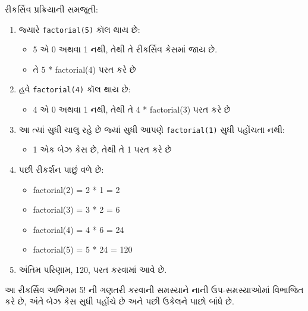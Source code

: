 રીકર્સિવ પ્રક્રિયાની સમજૂતી:

\begin{enumerate}
\def\labelenumi{\arabic{enumi}.}
\tightlist
\item
  જ્યારે \texttt{factorial(5)} કૉલ થાય છે:

  \begin{itemize}
  \tightlist
  \item
    5 એ 0 અથવા 1 નથી, તેથી તે રીકર્સિવ કેસમાં જાય છે.
  \item
    તે 5 * factorial(4) પરત કરે છે
  \end{itemize}
\item
  હવે \texttt{factorial(4)} કૉલ થાય છે:

  \begin{itemize}
  \tightlist
  \item
    4 એ 0 અથવા 1 નથી, તેથી તે 4 * factorial(3) પરત કરે છે
  \end{itemize}
\item
  આ ત્યાં સુધી ચાલુ રહે છે જ્યાં સુધી આપણે \texttt{factorial(1)} સુધી પહોંચતા નથી:

  \begin{itemize}
  \tightlist
  \item
    1 એક બેઝ કેસ છે, તેથી તે 1 પરત કરે છે
  \end{itemize}
\item
  પછી રીકર્શન પાછું વળે છે:

  \begin{itemize}
  \tightlist
  \item
    factorial(2) = 2 * 1 = 2
  \item
    factorial(3) = 3 * 2 = 6
  \item
    factorial(4) = 4 * 6 = 24
  \item
    factorial(5) = 5 * 24 = 120
  \end{itemize}
\item
  અંતિમ પરિણામ, 120, પરત કરવામાં આવે છે.
\end{enumerate}

આ રીકર્સિવ અભિગમ 5! ની ગણતરી કરવાની સમસ્યાને નાની ઉપ-સમસ્યાઓમાં વિભાજિત કરે છે,
અંતે બેઝ કેસ સુધી પહોંચે છે અને પછી ઉકેલને પાછો બાંધે છે.

\begin{Shaded}
\begin{Highlighting}[]
\end{Highlighting}
\end{Shaded}

